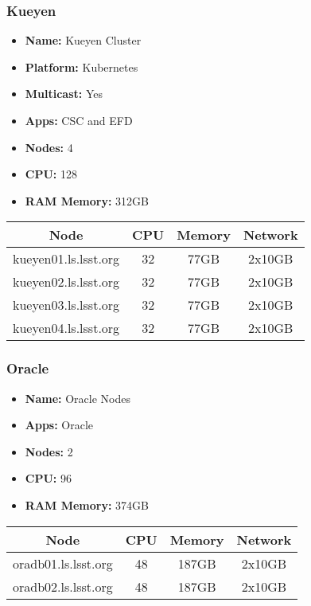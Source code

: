 \newpage
\subsubsection{Kueyen}
\begin{itemize}
  \itemsep0em 
  \item \textbf{Name:}       Kueyen Cluster
  \item \textbf{Platform:}   Kubernetes
  \item \textbf{Multicast:}  Yes
  \item \textbf{Apps:}       CSC and EFD
  \item \textbf{Nodes:}      4
  \item \textbf{CPU:}        128
  \item \textbf{RAM Memory:} 312GB
\end{itemize}
\begin{center}
  \small
  \begin{tabular}{||c c c c||}
    \hline
    \textbf{Node} & \textbf{CPU} & \textbf{Memory} & \textbf{Network} \\ [0.5ex]
    \hline
    kueyen01.ls.lsst.org & 32 & 77GB & 2x10GB \\
    \hline
    kueyen02.ls.lsst.org & 32 & 77GB & 2x10GB \\
    \hline
    kueyen03.ls.lsst.org & 32 & 77GB & 2x10GB \\
    \hline
    kueyen04.ls.lsst.org & 32 & 77GB & 2x10GB \\
    \hline
  \end{tabular}
\end{center}

\subsubsection{Oracle}
\begin{itemize}
  \itemsep0em 
  \item \textbf{Name:}       Oracle Nodes
  \item \textbf{Apps:}       Oracle
  \item \textbf{Nodes:}      2
  \item \textbf{CPU:}        96
  \item \textbf{RAM Memory:} 374GB
\end{itemize}
\begin{center}
  \small
  \begin{tabular}{||c c c c||} 
    \hline
    \textbf{Node} & \textbf{CPU} & \textbf{Memory} & \textbf{Network} \\ [0.5ex] 
    \hline
    oradb01.ls.lsst.org & 48 & 187GB & 2x10GB \\
    \hline
    oradb02.ls.lsst.org & 48 & 187GB & 2x10GB \\
    \hline
  \end{tabular}
\end{center}


